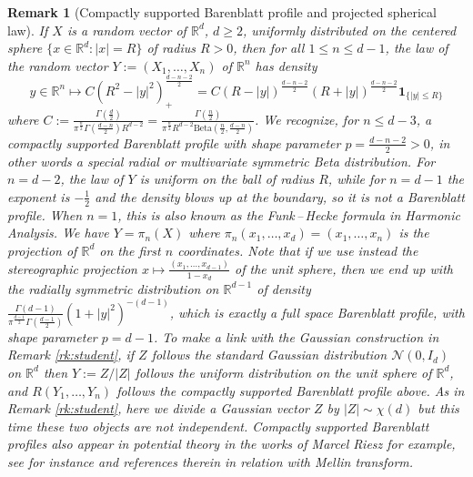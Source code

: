 \documentclass[10pt,reqno]{amsart}
\numberwithin{equation}{section}
\newtheorem{remark}[theorem]{Remark}%
\begin{document}
\begin{remark}[Compactly supported Barenblatt profile and projected spherical
  law]\label{rk:spherical}
  If $X$ is a random vector of $\mathbb{R}^d$, $d\geq2$, uniformly distributed
  on the centered sphere $\{x\in\mathbb{R}^d:|x|=R\}$ of radius $R>0$, then
  for all $1\leq n\leq d-1$, the law of the random vector $Y:=(X_1,\ldots,X_n)$
  of $\mathbb{R}^n$ has density
  \[
    y\in\mathbb{R}^n\mapsto
    C(R^2-|y|^2)_+^{\frac{d-n-2}{2}}
    =C(R-|y|)^{\frac{d-n-2}{2}}(R+|y|)^{\frac{d-n-2}{2}}\mathbf{1}_{\{|y|\leq R\}}
  \]
  where $C:=\frac{\Gamma(\frac{d}{2})}{\pi^{\frac{n}{2}}\Gamma(\frac{d-n}{2})R^{d-2}}=\frac{\Gamma(\frac{n}{2})}{\pi^{\frac{n}{2}}R^{d-2}\mathrm{Beta}(\frac{n}{2},\frac{d-n}{2})}$. We
  recognize, for $n\leq d-3$, a compactly supported Barenblatt profile with shape parameter
  $p=\frac{d-n-2}{2}>0$, in other words a special radial or multivariate
  symmetric Beta distribution. For $n=d-2$, the law of $Y$ is uniform on the
  ball of radius $R$, while for $n=d-1$ the exponent is $-\frac{1}{2}$ and the
  density blows up at the boundary, so it is not a Barenblatt profile. When $n=1$, this is also known as the
  Funk\,--\,Hecke formula in Harmonic Analysis. We have $Y=\pi_n(X)$ where
  $\pi_n(x_1,\ldots,x_d)=(x_1,\ldots,x_n)$ is the projection of $\mathbb{R}^d$
  on the first $n$ coordinates. Note that if we use instead the stereographic
  projection $x\mapsto\frac{(x_1,\ldots,x_{d-1})}{1-x_d}$ of the unit sphere,
  then we end up with the radially symmetric distribution on
  $\mathbb{R}^{d-1}$ of density
  $\frac{\Gamma(d-1)}{\pi^{\frac{d-1}{2}}\Gamma(\frac{d-1}{2})}(1+|y|^2)^{-(d-1)}$,
  which is exactly a full space Barenblatt profile, with shape parameter
  $p=d-1$. To make a link with the Gaussian construction in Remark \ref{rk:student}, if $Z$ follows the standard Gaussian distribution $\mathcal{N}(0,I_d)$ on $\mathbb{R}^d$ then $Y:=Z/|Z|$ follows the uniform distribution on the unit sphere of $\mathbb{R}^d$, and $R(Y_1,\ldots,Y_n)$ follows the compactly supported Barenblatt profile above. As in Remark \ref{rk:student}, here we divide a Gaussian vector $Z$ by $|Z|\sim\chi(d)$ but this time these two objects are not independent.
  Compactly supported Barenblatt profiles also appear in potential theory in the works of Marcel Riesz for example, see for instance \cite{zbMATH07559881,zbMATH07559881-post} and references therein in relation with Mellin transform.
\end{remark}



\end{document}
